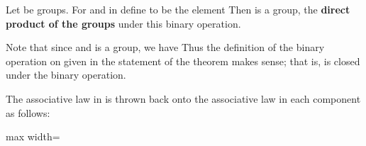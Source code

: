 \documentclass[11pt,oneside]{article}
\begin{document}
\begin{BookBody}

 Let  be groups. For  and  in  define  to be the element  Then  is a group, the\textbf{ direct product of the groups}  under this binary operation.

 Note that since  and  is a group, we have  Thus the definition of the binary operation on  given in the statement of the theorem makes sense; that is,  is closed under the binary operation.

The associative law in  is thrown back onto the associative law in each component as follows:

\begin{center}\begin{adjustbox}{max width=\linewidth}\end{adjustbox}\end{center}


\end{BookBody}
\end{document}
